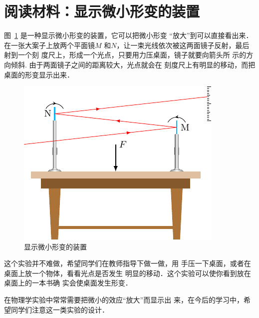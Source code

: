 \section*{阅读材料：显示微小形变的装置} 


图~\ref{fig_A_1-10} 是一种显示微小形变的装置，它可以把微小形变
“放大”到可以直接看出来．在一张大案子上放两个平面镜$M$
和$N$，让一束光线依次被这两面镜子反射，最后射到一个刻
度尺上，形成一个光点，只要用力压桌面，镜子就要向箭头所
示的方向倾斜. 由于两面镜子之间的距离较大，光点就会在
刻度尺上有明显的移动，而把桌面的形变显示出来．
\begin{figure}[htbp]
	\centering
	\includegraphics{fig/A/1-10.pdf} 
	\caption{显示微小形变的装置} \label{fig_A_1-10} 
\end{figure} 

    这个实验并不难做，希望同学们在教师指导下做一做，用
手压一下桌面，或者在桌面上放一个物体，看看光点是否发生
明显的移动．这个实验可以使你看到放在桌面上的一本书确
实会使桌面发生形变．

    在物理学实验中常常需要把微小的效应“放大”而显示出
来，在今后的学习中，希望同学们注意这一类实验的设计．



